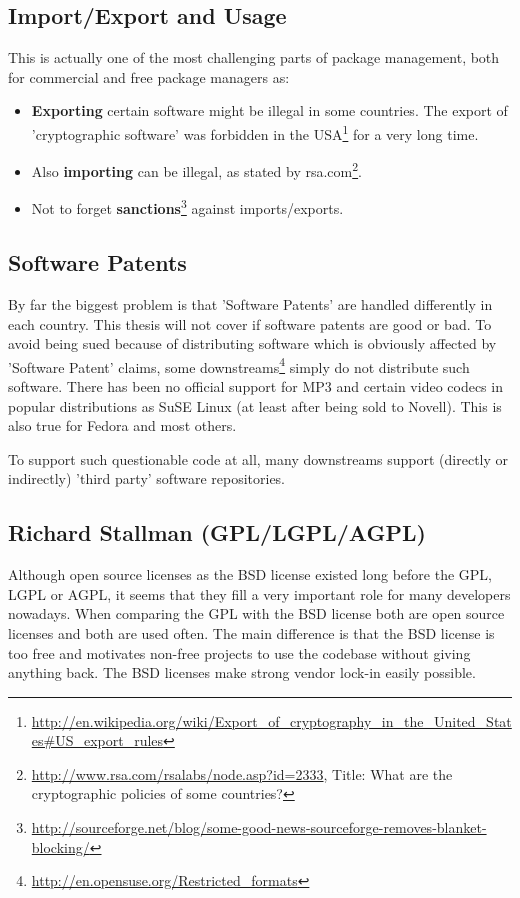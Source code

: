 \documentclass[a4paper,10pt]{article}
\begin{document}
\subsection{Import/Export and Usage}
This is actually one of the most challenging parts of package management, both for commercial and free package managers as: 
\begin{itemize}
\item \textbf{Exporting} certain software might be illegal in some countries. The export of 'cryptographic software' was forbidden in the USA\footnote{\url{http://en.wikipedia.org/wiki/Export_of_cryptography_in_the_United_States\#US_export_rules}} for a very long time.

\item Also \textbf{importing} can be illegal, as stated by rsa.com\footnote{\url{http://www.rsa.com/rsalabs/node.asp?id=2333}, Title: What are the cryptographic policies of some countries?}.

\item Not to forget \textbf{sanctions}\footnote{\url{http://sourceforge.net/blog/some-good-news-sourceforge-removes-blanket-blocking/}} against imports/exports.
\end{itemize}

\subsection{Software Patents}
By far the biggest problem is that 'Software Patents' are handled differently in each country. This thesis will not cover if software patents are good or bad. To avoid being sued because of distributing software which is obviously affected by 'Software Patent' claims, some downstreams\footnote{\url{http://en.opensuse.org/Restricted_formats}} simply do not distribute such software. There has been no official support for MP3 and certain video codecs in popular distributions as SuSE Linux (at least after being sold to Novell). This is also true for Fedora and most others.

To support such questionable code at all, many downstreams support (directly or indirectly) 'third party' software repositories.

\subsection{Richard Stallman (GPL/LGPL/AGPL)}
Although open source licenses as the BSD license existed long before the GPL, LGPL or AGPL, it seems that they fill a very important role for many developers nowadays. When comparing the GPL with the BSD license both are open source licenses and both are used often. The main difference is that the BSD license is too free and motivates non-free projects to use the codebase without giving anything back. The BSD licenses make strong vendor lock-in easily possible.
\end{document}
